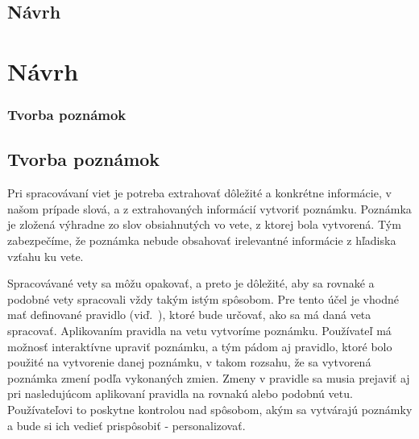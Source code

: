 \newpage
%
%
{
	\section{Návrh}
}
{
	\chapter{Návrh}
}
\label{section:design}

%
%
{
	\subsection{Tvorba poznámok}
}
{
	\section{Tvorba poznámok}
}
\label{subsection:notes_creation}
Pri spracovávaní viet je potreba extrahovať dôležité a konkrétne informácie, v našom prípade slová, a z extrahovaných informácií vytvoriť poznámku. Poznámka je zložená výhradne zo slov obsiahnutých vo vete, z ktorej bola vytvorená. Tým zabezpečíme, že poznámka nebude obsahovať irelevantné informácie z hľadiska vzťahu ku vete. 

Spracovávané vety sa môžu opakovať, a preto je dôležité, aby sa rovnaké a podobné vety spracovali vždy takým istým spôsobom. Pre tento účel je vhodné mať definované pravidlo (viď.~), ktoré bude určovať, ako sa má daná veta spracovať. Aplikovaním pravidla na vetu vytvoríme poznámku. Používateľ má možnosť interaktívne upraviť poznámku, a tým pádom aj pravidlo, ktoré bolo použité na vytvorenie danej poznámku, v takom rozsahu, že sa vytvorená poznámka zmení podľa vykonaných zmien. Zmeny v pravidle sa musia prejaviť aj pri nasledujúcom aplikovaní pravidla na rovnakú alebo podobnú vetu. Používateľovi to poskytne kontrolou nad spôsobom, akým sa vytvárajú poznámky a bude si ich vedieť prispôsobiť - personalizovať.

